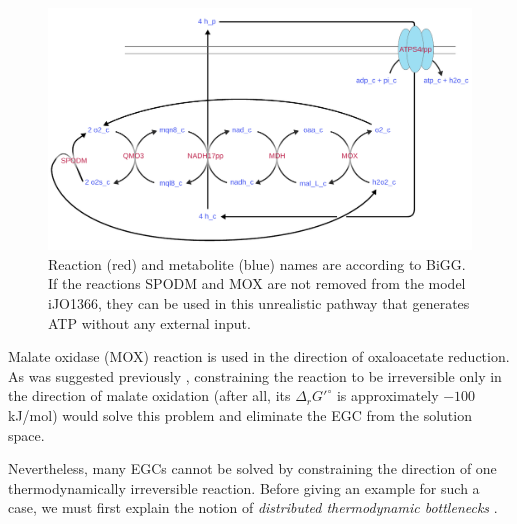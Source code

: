 \documentclass[twocolumn]{bmcart}%
\begin{document}
\begin{figure}[h!]
	\includegraphics[width=6in]{figure2.pdf}
 	\caption{
 		Reaction (red) and metabolite (blue) names are according to BiGG.
 		If the reactions SPODM and MOX are not removed from the model iJO1366, they can
 		be used in this unrealistic pathway that generates ATP without any
 		external input.}
 	\label{fig:egc_example}
\end{figure}

Malate oxidase (MOX) reaction is used in the direction of oxaloacetate reduction. As was suggested previously \cite{Fritzemeier2017-ba}, constraining the reaction to be irreversible only in the direction of malate oxidation (after all, its $\Delta_r G'^\circ$ is approximately $-100$ kJ/mol) would solve this problem and eliminate the EGC from the solution space.

Nevertheless, many EGCs cannot be solved by constraining the direction of one thermodynamically irreversible reaction. Before giving an example for such a case, we must first explain the notion of \emph{distributed thermodynamic bottlenecks} \cite{Mavrovouniotis1996-dq, Mavrovouniotis1993-zq}.
\end{document}
